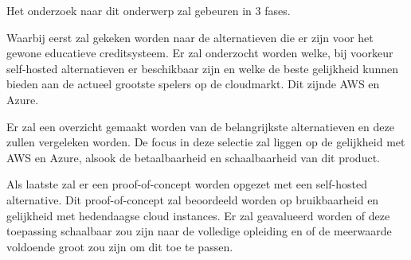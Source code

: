 Het onderzoek naar dit onderwerp zal gebeuren in 3 fases.

Waarbij eerst zal gekeken worden naar de alternatieven die er zijn voor het gewone educatieve creditsysteem. Er zal onderzocht worden welke, bij voorkeur self-hosted alternatieven er beschikbaar zijn en welke de beste gelijkheid kunnen bieden aan de actueel grootste spelers op de cloudmarkt. Dit zijnde AWS en Azure. 

Er zal een overzicht gemaakt worden van de belangrijkste alternatieven en deze zullen vergeleken worden. De focus in deze selectie zal liggen op de gelijkheid met AWS en Azure, alsook de betaalbaarheid en schaalbaarheid van dit product. 

Als laatste zal er een proof-of-concept worden opgezet met een self-hosted alternative.  Dit proof-of-concept zal beoordeeld worden op bruikbaarheid en gelijkheid met hedendaagse cloud instances. Er zal geavalueerd worden of deze toepassing schaalbaar zou zijn naar de volledige opleiding en of de meerwaarde voldoende groot zou zijn om dit toe te passen. 




